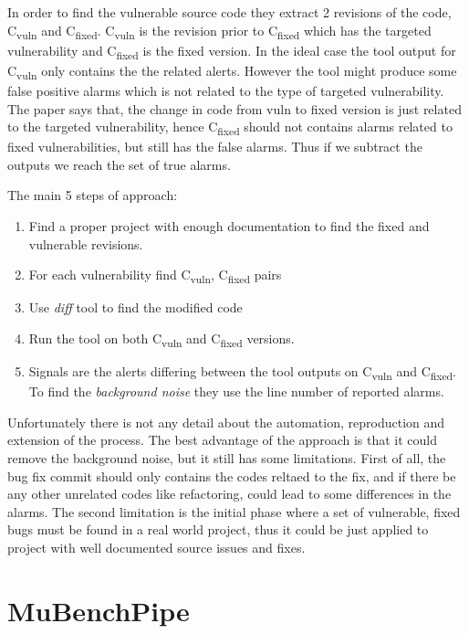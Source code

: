 \documentclass[authoryear,preprint]{sigplanconf}
\begin{document}
In order to find the vulnerable source code they extract 2 revisions of the code, C\textsubscript{vuln} and C\textsubscript{fixed}. C\textsubscript{vuln} is the revision prior to C\textsubscript{fixed} which has the targeted vulnerability and C\textsubscript{fixed} is the fixed version. In the ideal case the tool output for C\textsubscript{vuln} only contains the the related alerts. However the tool might produce some false positive alarms which is not related to the type of targeted vulnerability. The paper says that, the change in code from vuln to fixed version is just related to the targeted vulnerability, hence C\textsubscript{fixed} should not contains alarms related to fixed vulnerabilities, but still has the false alarms. Thus if we subtract the outputs we reach the set of true alarms. 

The main 5 steps of approach: 
\begin{enumerate}
	\item Find a proper project with enough documentation to find the fixed and vulnerable revisions. 
	\item For each vulnerability find  C\textsubscript{vuln},  C\textsubscript{fixed} pairs
	\item Use \textit{diff} tool to find the modified code
	\item Run the tool on both C\textsubscript{vuln} and C\textsubscript{fixed} versions.
	\item Signals are the alerts differing between the tool outputs on C\textsubscript{vuln} and C\textsubscript{fixed}. To find the \textit{background noise} they use the line number of reported alarms. 
\end{enumerate}

	Unfortunately there is not any detail about the automation, reproduction and extension of the process. The best advantage of the approach is that it could remove the background noise, but it still has some limitations. First of all, the bug fix commit should only contains the codes reltaed to the fix, and if there be any other unrelated codes like refactoring, could lead to some differences in the alarms. The second limitation is the initial phase where a set of vulnerable, fixed bugs must be found in a real world project, thus it could be just applied to project with well documented source issues and fixes.
	
\section{MuBenchPipe}
\label{sec:sec_mubenchpipe}
\end{document}
